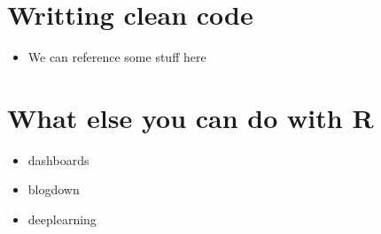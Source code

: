 \documentclass[]{book}
\providecommand{\tightlist}{%
  \setlength{\itemsep}{0pt}\setlength{\parskip}{0pt}}
\theoremstyle{definition}
\theoremstyle{definition}
\theoremstyle{definition}
\theoremstyle{remark}
\begin{document}
\section{Writting clean code}\label{writting-clean-code}

\begin{itemize}
\tightlist
\item
  We can reference some stuff here
\end{itemize}

\section{What else you can do with R}\label{what-else-you-can-do-with-r}

\begin{itemize}
\tightlist
\item
  dashboards
\item
  blogdown
\item
  deeplearning
\end{itemize}


\end{document}

